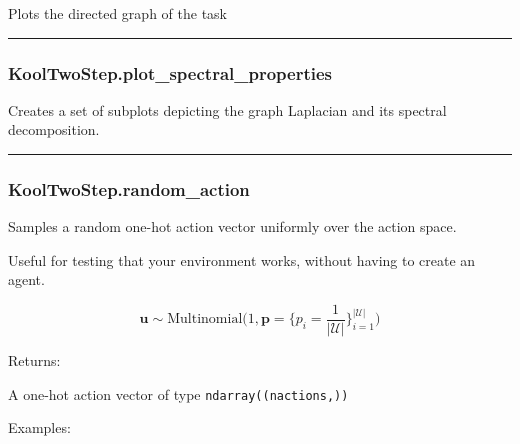 Plots the directed graph of the task

\begin{center}\rule{0.5\linewidth}{\linethickness}\end{center}

\subsubsection{KoolTwoStep.plot\_spectral\_properties}\label{kooltwostep.plot_spectral_properties}

\begin{Shaded}
\begin{Highlighting}[]
\OperatorTok{=}\OperatorTok{=}\OperatorTok{=}\NormalTok{)}
\end{Highlighting}
\end{Shaded}

Creates a set of subplots depicting the graph Laplacian and its spectral
decomposition.

\begin{center}\rule{0.5\linewidth}{\linethickness}\end{center}

\subsubsection{KoolTwoStep.random\_action}\label{kooltwostep.random_action}

\begin{Shaded}
\begin{Highlighting}[]
\NormalTok{)}
\end{Highlighting}
\end{Shaded}

Samples a random one-hot action vector uniformly over the action space.

Useful for testing that your environment works, without having to create
an agent.

\[
\mathbf u \sim \mathrm{Multinomial}\Big(1, \mathbf p=\{p_i = \frac{1}{|\mathcal U|}\}_{i=1}^{|\mathcal U|}\Big)
\]

Returns:

A one-hot action vector of type \texttt{ndarray((nactions,))}

Examples:

